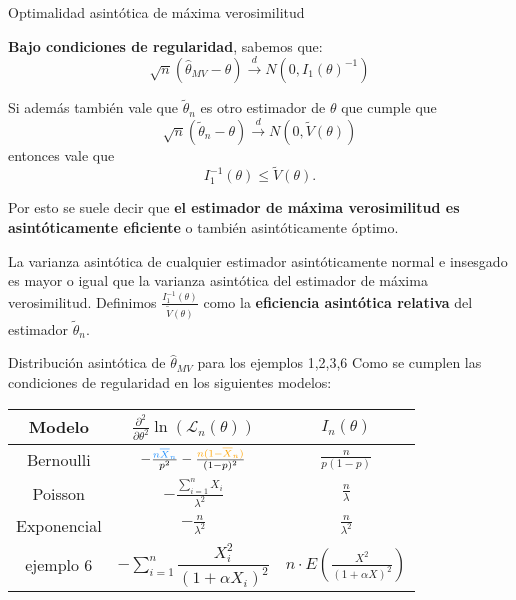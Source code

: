 \documentclass{beamer}
\theoremstyle{definition}
\newcommand{\cw}{\overset{d}{\rightarrow}}
\begin{document}
\begin{frame}{\color{rosee}Optimalidad asintótica de máxima verosimilitud}
\small

   
    
\textbf{Bajo condiciones de regularidad}, sabemos que:
 $$
    \sqrt{n}\left( \widehat{\theta}_{MV} - \theta\right) \cw N(0, I_{1}(\theta)^{-1}) 
    $$
    
Si además también vale que $\widetilde{\theta}_{n}$ es otro estimador de $\theta$ que cumple que 
$$
\sqrt{n}\left( \widetilde{\theta}_{n} - \theta\right) \cw N(0, \widetilde{V}(\theta))
$$
entonces vale que 
$$
I_{1}^{-1}(\theta)\leq \widetilde{V}(\theta).
$$

 \medskip Por esto se suele decir que\textbf{ el estimador de m\'axima
    verosimilitud es asintóticamente eficiente} o también asintóticamente óptimo.
    
 \medskip 
La varianza asintótica de cualquier estimador asintóticamente normal e insesgado es mayor o igual que la varianza asintótica del estimador de máxima verosimilitud. Definimos $\frac{I_{1}^{-1}(\theta)}{\widetilde{V}(\theta)}$
como la \textbf{eficiencia asintótica relativa} del estimador $\widetilde{\theta}_{n}$.

\end{frame}


\begin{frame}{\color{rosee}Distribuci\'on asint\'otica de $\widehat{\theta}_{MV}$ para los ejemplos 1,2,3,6}
  \small Como se cumplen las condiciones de regularidad en los siguientes modelos:

  \begin{center}
      \begin{tabular}{|c|c|c|}
      \hline
      Modelo    & $\frac{\partial^2}{\partial \theta^2}\ln\left(\mathcal{L}_n(\theta)\right)$ & $I_{n}(\theta)$\\
      \hline
      Bernoulli     & $-\frac{\color{dodgerblue}n\overline{X}_n}{p^2}-\frac{\color{orang}n(1-\overline{X}_n)}{(1-p)^{2}}$ & $\frac{n}{p(1-p)}$\\
      \hline
      Poisson     & $-\frac{\sum_{i=1}^nX_i}{\lambda^2}$ &$\frac{n}{\lambda}$\\
      \hline
      Exponencial     & $-\frac{n}{\lambda^2}$ & $\frac{n}{\lambda^2}$\\
      \hline
      ejemplo 6     & $-\sum_{i=1}^{n}
    \dfrac{X_i^2}{(1+\alpha X_{i})^2}$& $n\cdot E\left(\frac{X^2}{(1+\alpha X)^2}\right)$\\
      \hline
      \end{tabular}
  \end{center}
\end{frame}
\end{document}
